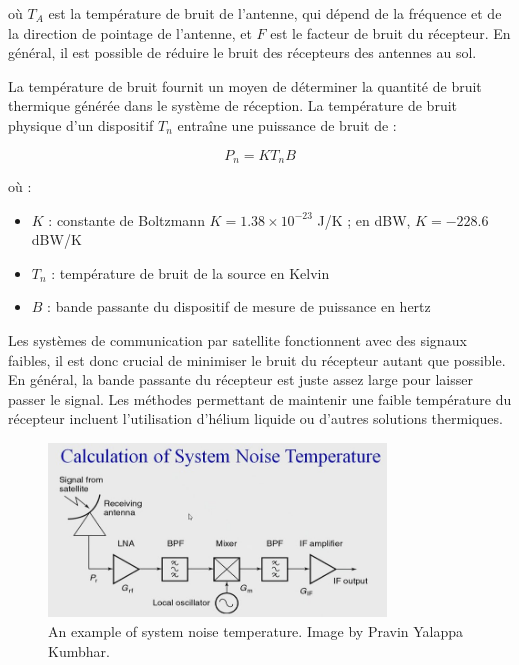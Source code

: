 où \(T_A\) est la température de bruit de l'antenne, qui dépend de la fréquence et de la direction de pointage de l'antenne, et \(F\) est le facteur de bruit du récepteur. En général, il est possible de réduire le bruit des récepteurs des antennes au sol.

La température de bruit fournit un moyen de déterminer la quantité de bruit thermique générée dans le système de réception. La température de bruit physique d'un dispositif \(T_n\) entraîne une puissance de bruit de :

\begin{equation}
    P_n = K T_n B
\end{equation}

où :

\begin{itemize}
    \item \(K\) : constante de Boltzmann \(K = 1.38 \times 10^{-23} \) J/K ; en dBW, \(K = -228.6\) dBW/K
    \item \(T_n\) : température de bruit de la source en Kelvin
    \item \(B\) : bande passante du dispositif de mesure de puissance en hertz
\end{itemize}

Les systèmes de communication par satellite fonctionnent avec des signaux faibles, il est donc crucial de minimiser le bruit du récepteur autant que possible. En général, la bande passante du récepteur est juste assez large pour laisser passer le signal. Les méthodes permettant de maintenir une faible température du récepteur incluent l'utilisation d'hélium liquide ou d'autres solutions thermiques.

\begin{figure}[H] %
    \centering
    \includegraphics[width=0.8\textwidth]{figures/6-122.jpg}
    
    \caption{An example of system noise temperature. Image by Pravin Yalappa Kumbhar.}
    \label{fig:communication2}
\end{figure}


